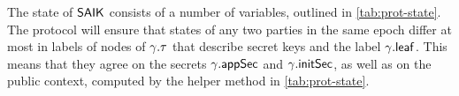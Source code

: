 
The state of ${\normalfont\textsf{SAIK}}$ consists of a number of variables, outlined in \cref{tab:prot-state}. The protocol will ensure that states of any two parties in the same epoch differ at most in labels of nodes of $\gamma.\tau$ that describe secret keys and the label $\gamma.{\mathsf{leaf}}$. This means that they agree on the secrets $\gamma.{\mathsf{appSec}}$ and $\gamma.{\mathsf{initSec}}$, as well as on the public context, computed by the helper method in \cref{tab:prot-state}.


